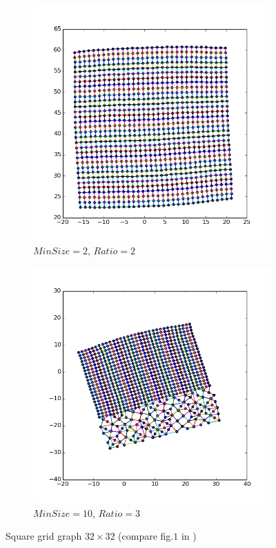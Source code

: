 \documentclass[12pt,a4paper]{article}
\begin{document}
\begin{figure}[htb]
	 \begin{subfigure}{0.5\textwidth}
		   \centering
           \includegraphics[scale=0.44]{results_Harel/HK_grid32x32_m2r2.png}
           \caption{$MinSize=2$, $Ratio=2$}
     \end{subfigure}
	 \begin{subfigure}{0.5\textwidth}
			\centering
           \includegraphics[scale=0.44]{results_Harel/HK_grid32x32_m10_r3.png}
            \caption{$MinSize=10$, $Ratio=3$}
     \end{subfigure}
     \caption{Square grid graph $32\times 32$ (compare fig.$1$ in \cite{DavidHarel2002})}
     \label{fig: difMinSize}
\end{figure}     
\end{document}
